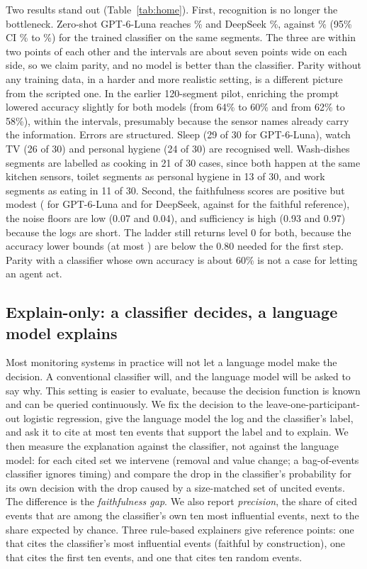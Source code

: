 \documentclass[11pt,a4paper]{article}
\begin{document}
Two results stand out (Table~\ref{tab:home}). First, recognition is no longer the bottleneck. Zero-shot GPT-6-Luna reaches \HLunaPlAcc\% and DeepSeek \HDeepPlAcc\%, against \HomeRefAcc\% (95\% CI \HomeRefAccLo\% to \HomeRefAccHi\%) for the trained classifier on the same segments. The three are within two points of each other and the intervals are about seven points wide on each side, so we claim parity, and no model is better than the classifier. Parity without any training data, in a harder and more realistic setting, is a different picture from the scripted one. In the earlier 120-segment pilot, enriching the prompt lowered accuracy slightly for both models (from 64\% to 60\% and from 62\% to 58\%), within the intervals, presumably because the sensor names already carry the information. Errors are structured. Sleep (29 of 30 for GPT-6-Luna), watch TV (26 of 30) and personal hygiene (24 of 30) are recognised well. Wash-dishes segments are labelled as cooking in 21 of 30 cases, since both happen at the same kitchen sensors, toilet segments as personal hygiene in 13 of 30, and work segments as eating in 11 of 30. Second, the faithfulness scores are positive but modest (\HLunaPlF{} for GPT-6-Luna and \HDeepPlF{} for DeepSeek, against \HomeRefF{} for the faithful reference), the noise floors are low (0.07 and 0.04), and sufficiency is high (0.93 and 0.97) because the logs are short. The ladder still returns level 0 for both, because the accuracy lower bounds (at most \HomeMaxAccLo) are below the 0.80 needed for the first step. Parity with a classifier whose own accuracy is about 60\% is not a case for letting an agent act.

\subsection{Explain-only: a classifier decides, a language model explains}
\label{sec:explain}
Most monitoring systems in practice will not let a language model make the decision. A conventional classifier will, and the language model will be asked to say why. This setting is easier to evaluate, because the decision function is known and can be queried continuously. We fix the decision to the leave-one-participant-out logistic regression, give the language model the log and the classifier's label, and ask it to cite at most ten events that support the label and to explain. We then measure the explanation against the classifier, not against the language model: for each cited set we intervene (removal and value change; a bag-of-events classifier ignores timing) and compare the drop in the classifier's probability for its own decision with the drop caused by a size-matched set of uncited events. The difference is the \emph{faithfulness gap}. We also report \emph{precision}, the share of cited events that are among the classifier's own ten most influential events, next to the share expected by chance. Three rule-based explainers give reference points: one that cites the classifier's most influential events (faithful by construction), one that cites the first ten events, and one that cites ten random events.
\end{document}
